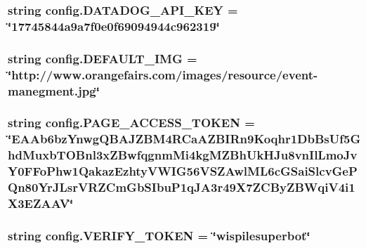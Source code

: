 \subsubsection[{D\+A\+T\+A\+D\+O\+G\+\_\+\+A\+P\+I\+\_\+\+K\+EY}]{\setlength{\rightskip}{0pt plus 5cm}string config.\+D\+A\+T\+A\+D\+O\+G\+\_\+\+A\+P\+I\+\_\+\+K\+EY = \char`\"{}17745844a9a7f0e0f69094944c962319\char`\"{}}\label{namespaceconfig_a0f2d4d4bafa2eaaa58fc284e18fdeee1}
\subsubsection[{D\+E\+F\+A\+U\+L\+T\+\_\+\+I\+MG}]{\setlength{\rightskip}{0pt plus 5cm}string config.\+D\+E\+F\+A\+U\+L\+T\+\_\+\+I\+MG = \char`\"{}http\+://www.\+orangefairs.\+com/images/resource/event-\/manegment.\+jpg\char`\"{}}\label{namespaceconfig_aa51dcd0914387b17117f3061b72b7f6d}
\subsubsection[{P\+A\+G\+E\+\_\+\+A\+C\+C\+E\+S\+S\+\_\+\+T\+O\+K\+EN}]{\setlength{\rightskip}{0pt plus 5cm}string config.\+P\+A\+G\+E\+\_\+\+A\+C\+C\+E\+S\+S\+\_\+\+T\+O\+K\+EN = \char`\"{}E\+A\+Ab6bz\+Ynwg\+Q\+B\+A\+J\+Z\+B\+M4\+R\+Ca\+A\+Z\+B\+I\+Rn9\+Koqhr1\+Db\+Bs\+Uf5\+Ghd\+Muxb\+T\+O\+Bnl3x\+Z\+Bwfqgnm\+Mi4kg\+M\+Z\+Bh\+Uk\+H\+Ju8vn\+Il\+Lmo\+Jv\+Y0\+F\+Fo\+Phw1\+Qakaz\+Ezhty\+V\+W\+I\+G56\+V\+S\+Z\+Awl\+M\+L6c\+G\+Sai\+Slcv\+Ge\+P\+Qn80\+Yr\+J\+Lsr\+V\+R\+Z\+Cm\+Gb\+S\+Ibu\+P1q\+J\+A3r49\+X7\+Z\+C\+By\+Z\+B\+Wqi\+V4i1\+X3\+E\+Z\+A\+AV\char`\"{}}\label{namespaceconfig_a63629265b02df29d2053e349acd55005}
\subsubsection[{V\+E\+R\+I\+F\+Y\+\_\+\+T\+O\+K\+EN}]{\setlength{\rightskip}{0pt plus 5cm}string config.\+V\+E\+R\+I\+F\+Y\+\_\+\+T\+O\+K\+EN = \char`\"{}wispilesuperbot\char`\"{}}\label{namespaceconfig_ac6cfdb9d031328c327f595ac7feded90}

